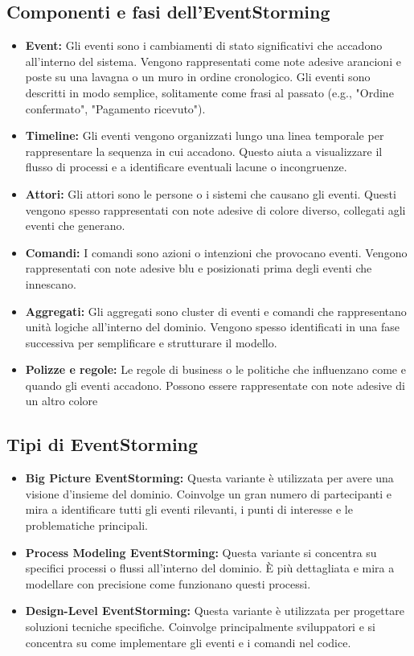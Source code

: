 \subsection{Componenti e fasi dell'EventStorming}
\begin{itemize}
    \item \textbf{Event:} Gli eventi sono i cambiamenti di stato significativi che accadono all'interno del sistema. Vengono rappresentati come note adesive arancioni e poste su una lavagna o un muro in ordine cronologico. Gli eventi sono descritti in modo semplice, solitamente come frasi al passato (e.g., "Ordine confermato", "Pagamento ricevuto").
    \item \textbf{Timeline:} Gli eventi vengono organizzati lungo una linea temporale per rappresentare la sequenza in cui accadono. Questo aiuta a visualizzare il flusso di processi e a identificare eventuali lacune o incongruenze.
    \item \textbf{Attori:} Gli attori sono le persone o i sistemi che causano gli eventi. Questi vengono spesso rappresentati con note adesive di colore diverso, collegati agli eventi che generano.
\item \textbf{Comandi:} I comandi sono azioni o intenzioni che provocano eventi. Vengono rappresentati con note adesive blu e posizionati prima degli eventi che innescano.
\item \textbf{Aggregati:} Gli aggregati sono cluster di eventi e comandi che rappresentano unità logiche all'interno del dominio. Vengono spesso identificati in una fase successiva per semplificare e strutturare il modello.
\item \textbf{Polizze e regole:} Le regole di business o le politiche che influenzano come e quando gli eventi accadono. Possono essere rappresentate con note adesive di un altro colore
\end{itemize}

\subsection{Tipi di EventStorming}
\begin{itemize}
    \item \textbf{Big Picture EventStorming:} Questa variante è utilizzata per avere una visione d'insieme del dominio. Coinvolge un gran numero di partecipanti e mira a identificare tutti gli eventi rilevanti, i punti di interesse e le problematiche principali.
    \item \textbf{Process Modeling EventStorming:} Questa variante si concentra su specifici processi o flussi all'interno del dominio. È più dettagliata e mira a modellare con precisione come funzionano questi processi.
    \item \textbf{Design-Level EventStorming:} Questa variante è utilizzata per progettare soluzioni tecniche specifiche. Coinvolge principalmente sviluppatori e si concentra su come implementare gli eventi e i comandi nel codice.
\end{itemize}

